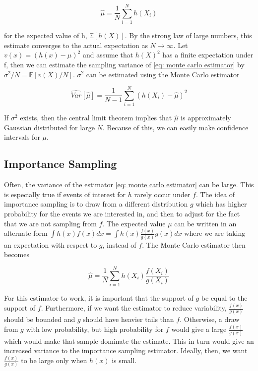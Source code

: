 \begin{equation}
\hat{\mu} = \frac{1}{N} \sum_{i=1}^N h(X_i)
\label{eq: monte carlo estimator}    
\end{equation}
  
for the expected value of h, $\mathbb{E}[h(X)]$. By the strong law of large numbers, this estimate converges to the actual expectation as $N\rightarrow\infty$. Let $v(x) = (h(x) - {\mu})^2$ and assume that $h(X)^2$ has a finite expectation under f, then we can estimate the sampling variance of \eqref{eq: monte carlo estimator} by $\sigma^2/N = \mathbb{E}[v(X)/N]$. $\sigma^2$ can be estimated using the Monte Carlo estimator

\begin{equation}
    \widehat{Var}[\hat{\mu}] = \frac{1}{N-1}\sum_{i=1}^N (h(X_i) - \hat{\mu})^2
\end{equation}

If $\sigma^2$ exists, then the central limit theorem implies that $\hat{\mu}$ is approximately Gaussian distributed for large $N$. Because of this, we can easily make confidence intervals for $\mu$\parencite{givens2013computational}.


\subsection{Importance Sampling}
\label{subsec: importance sampling theory}
Often, the variance of the estimator \eqref{eq: monte carlo estimator} can be large. This is especially true if events of interest for $h$ rarely occur under $f$. The idea of importance sampling is to draw from a different distribution $g$ which has higher probability for the events we are interested in, and then to adjust for the fact that we are not sampling from $f$. The expected value $\mu$ can be written in an alternate form $\int h(x)f(x)dx = \int h(x)\frac{f(x)}{g(x)}g(x) dx$ where we are taking an expectation with respect to $g$, instead of $f$. The Monte Carlo estimator then becomes

\begin{equation}
    \hat{\mu} = \frac{1}{N} \sum_{i=1}^N h(X_i)\frac{f(X_i)}{g(X_i)}
\end{equation}

For this estimator to work, it is important that the support of $g$ be equal to the support of $f$. Furthermore, if we want the estimator to reduce variability, $\frac{f(x)}{g(x)}$ should be bounded and $g$ should have heavier tails than $f$. Otherwise, a draw from $g$ with low probability, but high probability for $f$ would give a large $\frac{f(x)}{g(x)}$ which would make that sample dominate the estimate. This in turn would give an increased variance to the importance sampling estimator. Ideally, then, we want $\frac{f(x)}{g(x)}$ to be large only when $h(x)$ is small. \parencite{givens2013computational}






